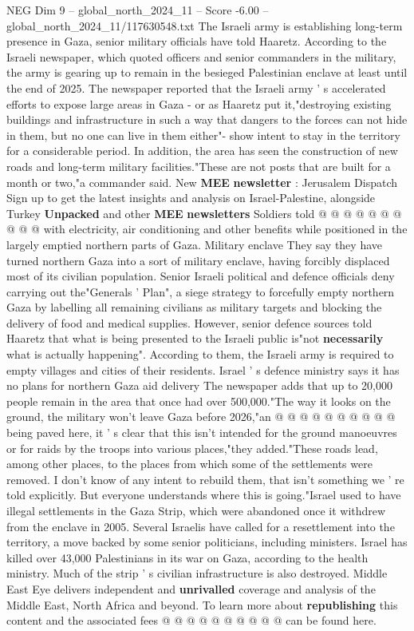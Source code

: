 \begin{textsample}{NEG Dim 9 – global\_north\_2024\_11 – Score -6.00 – global\_north\_2024\_11/117630548.txt}  \label{ex:f9_neg_048}
The Israeli army is establishing long-term presence in Gaza, senior military officials have told Haaretz.
According to the Israeli newspaper, which quoted officers and senior commanders in the military, the army is gearing up to remain in the besieged Palestinian enclave at least until the end of 2025.
The newspaper reported that the Israeli army ' s accelerated efforts to expose large areas in Gaza - or as Haaretz put it,"destroying existing buildings and infrastructure in such a way that dangers to the forces can not hide in them, but no one can live in them either"- show intent to stay in the territory for a considerable period.
In addition, the area has seen the construction of new roads and long-term military facilities."These are not posts that are built for a month or two,"a commander said.
New \textbf{MEE} \textbf{newsletter} : Jerusalem Dispatch Sign up to get the latest insights and analysis on Israel-Palestine, alongside Turkey \textbf{Unpacked} and other \textbf{MEE} \textbf{newsletters} Soldiers told @ @ @ @ @ @ @ @ @ @ with electricity, air conditioning and other benefits while positioned in the largely emptied northern parts of Gaza.
Military enclave They say they have turned northern Gaza into a sort of military enclave, having forcibly displaced most of its civilian population.
Senior Israeli political and defence officials deny carrying out the"Generals ' Plan", a siege strategy to forcefully empty northern Gaza by labelling all remaining civilians as military targets and blocking the delivery of food and medical supplies.
However, senior defence sources told Haaretz that what is being presented to the Israeli public is"not \textbf{necessarily} what is actually happening".
According to them, the Israeli army is required to empty villages and cities of their residents.
Israel ' s defence ministry says it has no plans for northern Gaza aid delivery The newspaper adds that up to 20,000 people remain in the area that once had over 500,000."The way it looks on the ground, the military won't leave Gaza before 2026,"an @ @ @ @ @ @ @ @ @ @ being paved here, it ' s clear that this isn't intended for the ground manoeuvres or for raids by the troops into various places,"they added."These roads lead, among other places, to the places from which some of the settlements were removed.
I don't know of any intent to rebuild them, that isn't something we ' re told explicitly.
But everyone understands where this is going."Israel used to have illegal settlements in the Gaza Strip, which were abandoned once it withdrew from the enclave in 2005.
Several Israelis have called for a resettlement into the territory, a move backed by some senior politicians, including ministers.
Israel has killed over 43,000 Palestinians in its war on Gaza, according to the health ministry.
Much of the strip ' s civilian infrastructure is also destroyed.
Middle East Eye delivers independent and \textbf{unrivalled} coverage and analysis of the Middle East, North Africa and beyond.
To learn more about \textbf{republishing} this content and the associated fees @ @ @ @ @ @ @ @ @ @ can be found here.

\end{textsample}
